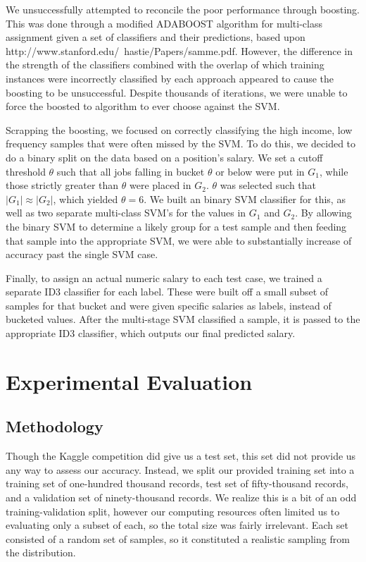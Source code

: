 \documentclass{pset}
\begin{document}
We unsuccessfully attempted to reconcile the poor performance through boosting.
This was done through a modified ADABOOST algorithm for multi-class assignment
given a set of classifiers and their predictions, based upon
http://www.stanford.edu/~hastie/Papers/samme.pdf. However, the difference in
the strength of the classifiers combined with the overlap of which training
instances were incorrectly classified by each approach appeared to cause the
boosting to be unsuccessful. Despite thousands of iterations, we were unable to
force the boosted to algorithm to ever choose against the SVM. 

Scrapping the boosting, we focused on correctly classifying the high income,
low frequency samples that were often missed by the SVM. To do this, we decided
to do a binary split on the data based on a position's salary. We set a cutoff
threshold $\theta$ such that all jobs falling in bucket $\theta$ or below were
put in $G_1$, while those strictly greater than $\theta$ were placed in $G_2$.
$\theta$ was selected such that $|G_1| \approx |G_2|$, which yielded $\theta =
6$. We built an binary SVM classifier for this, as well as two separate
multi-class SVM's for the values in $G_1$ and $G_2$. By allowing the binary SVM
to determine a likely group for a test sample and then feeding that sample into
the appropriate SVM, we were able to substantially increase of accuracy past
the single SVM case. 

Finally, to assign an actual numeric salary to each test case, we trained a
separate ID3 classifier for each label. These were built off a small subset of
samples for that bucket and were given specific salaries as labels, instead of
bucketed values. After the multi-stage SVM classified a sample, it is passed to
the appropriate ID3 classifier, which outputs our final predicted salary.

\section{Experimental Evaluation}

\subsection{Methodology}
Though the Kaggle competition did give us a test set, this set did not provide
us any way to assess our accuracy. Instead, we split our provided training set
into a training set of one-hundred thousand records, test set of fifty-thousand
records, and a validation set of ninety-thousand records. We realize this is a
bit of an odd training-validation split, however our computing resources often
limited us to evaluating only a subset of each, so the total size was fairly
irrelevant. Each set consisted of a random set of samples, so it constituted a
realistic sampling from the distribution. 
\end{document}
